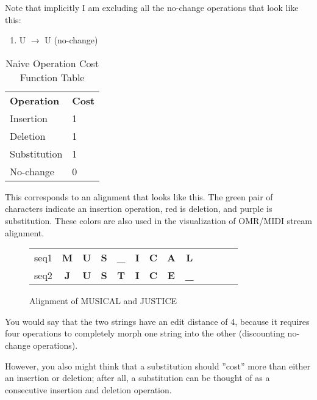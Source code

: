 Note that implicitly I am excluding all the no-change operations that look like this:
\begin{enumerate}
\item U $\rightarrow$  U (no-change)
\end{enumerate}

\begin{table}[!h]
\centering
\begin{tabular}{ll}
\textbf{Operation} & \textbf{Cost} \\
Insertion          & 1             \\
Deletion           & 1             \\
Substitution       & 1             \\
No-change          & 0            
\end{tabular}
\caption{Naive Operation Cost Function Table}
\label{tab:naivetable}
\end{table}
	
This corresponds to an alignment that looks like this. The green pair of characters indicate an insertion operation, red is deletion, and purple is substitution. These colors are also used in the visualization of OMR/MIDI stream alignment. 

\begin{figure}[!h]
\centering
\begin{tabular}{lcccccccccccc}
seq1 & {\color[HTML]{6200C9} \textbf{M}} & \textbf{U} & \textbf{S} & {\color[HTML]{009901} \textbf{\_}} & \textbf{I} & \textbf{C} & {\color[HTML]{6200C9} \textbf{A}} & {\color[HTML]{9A0000} \textbf{L}}  & \textbf{} & \textbf{} & \textbf{} &  \\
seq2 & {\color[HTML]{6200C9} \textbf{J}} & \textbf{U} & \textbf{S} & {\color[HTML]{009901} \textbf{T}}  & \textbf{I} & \textbf{C} & {\color[HTML]{6200C9} \textbf{E}} & {\color[HTML]{9A0000} \textbf{\_}} & \textbf{} & \textbf{} & \textbf{} & 
\end{tabular}
\caption{Alignment of MUSICAL and JUSTICE}
\label{best-alignment}
\end{figure}

You would say that the two strings have an edit distance of 4, because it requires four operations to completely morph one string into the other (discounting no-change operations).

However, you also might think that a substitution should ''cost'' more than either an insertion or deletion; after all, a substitution can be thought of as a consecutive insertion and deletion operation. 

